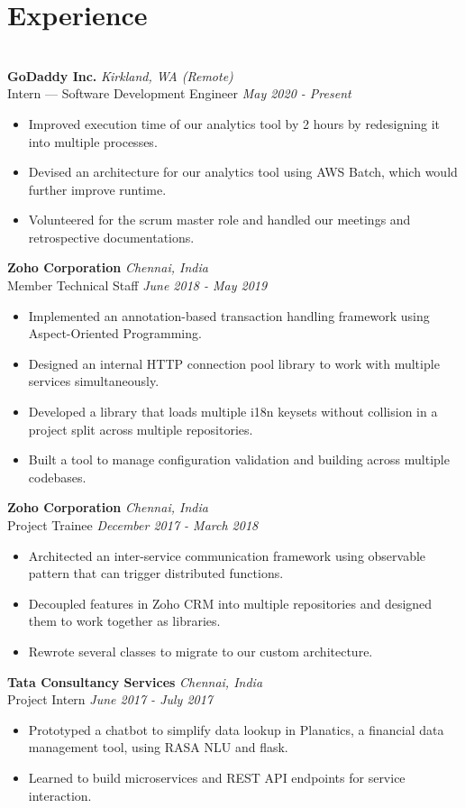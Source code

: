 \documentclass{resume}
\begin{document}
\section*{Experience}
\titlerule
\noindent
\\
\textbf{GoDaddy Inc.} \hfill \textit{Kirkland, WA (Remote)} \\
{\small Intern --- Software Development Engineer} \hfill \textit{\small May 2020 - Present}
\begin{itemize}
  \item Improved execution time of our analytics tool by 2 hours by redesigning it into multiple processes.
  \item Devised an architecture for our analytics tool using AWS Batch, which would further improve runtime.
  \item Volunteered for the scrum master role and handled our meetings and retrospective documentations.
\end{itemize}
\textbf{Zoho Corporation} \hfill \textit{Chennai, India} \\
{\small Member Technical Staff} \hfill \textit{\small June 2018 - May 2019}
\begin{itemize}
  \item Implemented an annotation-based transaction handling framework using Aspect-Oriented Programming.
  \item Designed an internal HTTP connection pool library to work with multiple services simultaneously.
  \item Developed a library that loads multiple i18n keysets without collision in a project split across multiple repositories.
  \item Built a tool to manage configuration validation and building across multiple codebases.
\end{itemize}
\textbf{Zoho Corporation} \hfill \textit{Chennai, India} \\
{\small Project Trainee} \hfill \textit{\small December 2017 - March 2018}
\begin{itemize}
  \item Architected an inter-service communication framework using observable pattern that can trigger distributed functions.
  \item Decoupled features in Zoho CRM into multiple repositories and designed them to work together as libraries.
  \item Rewrote several classes to migrate to our custom architecture.
\end{itemize}
\textbf{Tata Consultancy Services} \hfill \textit{Chennai, India} \\
{\small Project Intern} \hfill \textit{\small June 2017 - July 2017}
\begin{itemize}
  \item Prototyped a chatbot to simplify data lookup in Planatics, a financial data management tool, using RASA NLU and flask.
  \item Learned to build microservices and REST API endpoints for service interaction.
\end{itemize}
\end{document}

